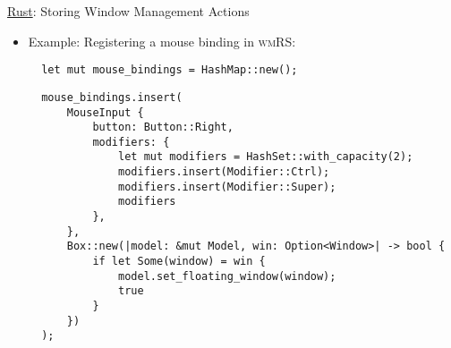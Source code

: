 \begin{frame}[fragile]{\underline{Rust}: Storing Window Management Actions \hfill {\footnotesize \currentname}}


    \begin{itemize}

        \item Example: Registering a mouse binding in \textsc{wmRS}:\\[3pt] 
\begin{verbatim}
  let mut mouse_bindings = HashMap::new();
\end{verbatim}
\begin{verbatim}
  mouse_bindings.insert(
      MouseInput {
          button: Button::Right,
          modifiers: {
              let mut modifiers = HashSet::with_capacity(2);
              modifiers.insert(Modifier::Ctrl);
              modifiers.insert(Modifier::Super);
              modifiers
          },
      },
      Box::new(|model: &mut Model, win: Option<Window>| -> bool {
          if let Some(window) = win {
              model.set_floating_window(window);
              true
          }
      })
  );
\end{verbatim}

    \end{itemize}

    \vfill

\end{frame}



